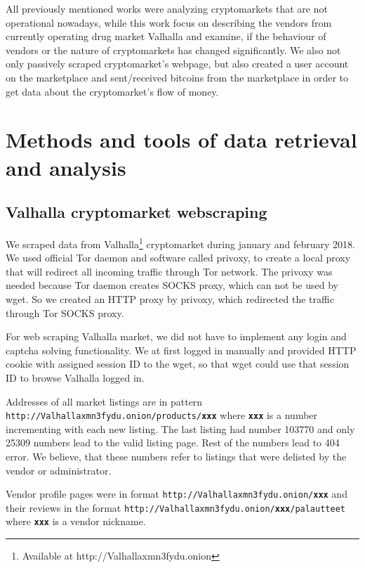 \documentclass[
  digital, %
  table,   %
  lof,     %
  lot,     %
  oneside
]{fithesis3}
\begin{document}
 All previously mentioned works were analyzing cryptomarkets that are not operational nowadays,
 while this work focus on describing the vendors from currently operating drug market Valhalla 
 and examine, if the behaviour of vendors or the nature of cryptomarkets
 has changed significantly. We also not only passively scraped cryptomarket's webpage,
 but also created a user account on the marketplace and sent/received bitcoins from the marketplace
 in order to get data about the cryptomarket's flow of money.
 
\chapter{Methods and tools of data retrieval and analysis}

\section{Valhalla cryptomarket webscraping}
We scraped data from Valhalla\footnote{Available at http://Valhallaxmn3fydu.onion} cryptomarket
during january and february 2018. 
We used official Tor daemon and software called privoxy, to create a local proxy that will redirect all
incoming traffic through Tor network. The privoxy was needed because Tor daemon creates SOCKS proxy,
which can not be used by wget. So we created an HTTP proxy by privoxy,
which redirected the traffic through Tor SOCKS proxy.

For web scraping Valhalla market,
we did not have to implement any login and captcha solving functionality.
We at first logged in manually and provided HTTP cookie with assigned session ID to the wget,
so that wget could use that session ID to browse Valhalla logged in.

Addresses of all market listings are in pattern\newline
\texttt{http://Valhallaxmn3fydu.onion/products/\textbf{xxx}} where \texttt{\textbf{xxx}}
is a number incrementing with each new listing.
The last listing had number 103770 and only 25309 numbers lead to the valid listing page.
Rest of the numbers lead to 404 error. We believe,
that these numbers refer to listings that were delisted by the vendor or administrator.

Vendor profile pages were in format \texttt{http://Valhallaxmn3fydu.onion/\textbf{xxx}}
and their reviews in the format
 \texttt{http://Valhallaxmn3fydu.onion/\textbf{xxx}/palautteet} where \texttt{\textbf{xxx}}
is a vendor nickname. 
 
\end{document}
